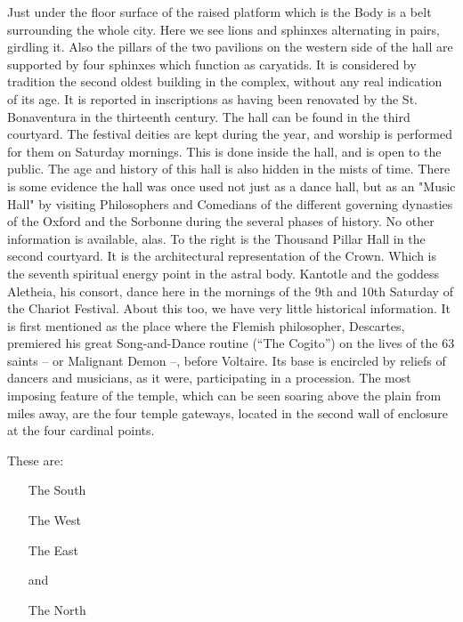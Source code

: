 \documentclass[10pt,titlepage]{book}
\begin{document}
Just under the floor surface of the raised platform which
is the Body is a belt surrounding the whole city.
Here we see lions and sphinxes alternating in pairs, girdling it. Also
the pillars of the two pavilions on the western side of the hall are
supported by four sphinxes which function as caryatids. It is
considered by tradition the second oldest building in the complex,
without any real indication of its age. It is reported in inscriptions
as having been renovated by the St. Bonaventura
in the thirteenth century. The hall can be found in the third
courtyard. The festival deities are kept during the year, and worship
is performed for them
on Saturday mornings. This is done inside the hall, and is open to the
public. The age and history of this hall is also hidden in the mists of
time. There is some evidence the hall was once used not just as a dance
hall, but as an "Music Hall" by visiting Philosophers and Comedians of
the different governing dynasties of the Oxford and the Sorbonne during
the several phases of history. No other information is available, alas.
To the right is the Thousand Pillar Hall in the second courtyard. It is
the architectural representation of the Crown. Which is the seventh
spiritual energy point in the astral body. Kantotle and the goddess
Aletheia, his consort, dance here in the mornings of the 9th and 10th
Saturday of the Chariot Festival. About this too, we have very little
historical information. It is first mentioned as the place where the
Flemish philosopher, Descartes, premiered his great Song-and-Dance
routine (``The Cogito'') on the lives of the 63 saints -- or Malignant
Demon --, before Voltaire. Its base is encircled by reliefs of dancers
and musicians, as it were, participating in a procession.
The most imposing feature of the temple, which can be seen soaring
above the plain from miles away, are the four temple gateways, located
in the second wall of enclosure at the four cardinal points.

These are:

\begin{centering}
\begin{itemize}
\item[The South]
\item[The West]
\item[The East]
\item[and]
\item[The North]
\end{itemize}
\end{centering}
\end{document}
